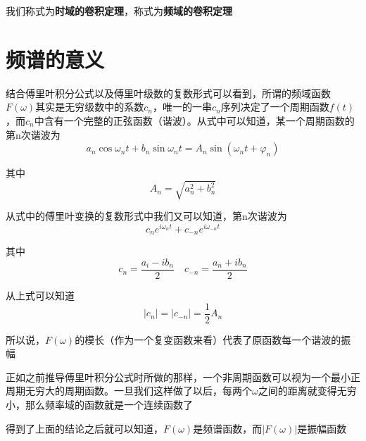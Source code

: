         我们称式为\textbf{时域的卷积定理}，称式为\textbf{频域的卷积定理}

    \section{频谱的意义}
        结合傅里叶积分公式以及傅里叶级数的复数形式可以看到，所谓的频域函数$F(\omega)$其实是无穷级数中的系数$c_n$，唯一的一串$c_n$序列决定了一个周期函数$f(t)$，而$c_n$中含有一个完整的正弦函数（谐波）。从式中可以知道，某一个周期函数的第n次谐波为
        \begin{equation}
            a_n\cos \omega_n t+b_n\sin\omega_n t=A_n\sin(\omega_n t + \varphi_n)
            \label{eq: 1.34}
        \end{equation}

        其中
        \begin{equation}
            A_n = \sqrt{a_n^2+b_n^2}
            \label{eq: 1.35}
        \end{equation}

        从式中的傅里叶变换的复数形式中我们又可以知道，第n次谐波为
        \begin{equation}
            c_ne^{i\omega_nt}+c_{-n}e^{i\omega_{-n}t}
            \label{eq: 1.36}
        \end{equation}

        其中
        \begin{equation}
            c_n=\dfrac{a_i-ib_n}{2}\quad c_{-n} = \dfrac{a_n + ib_n}{2}
            \label{eq: 1.37}
        \end{equation}

        从上式可以知道
        \begin{equation}
            |c_n| = |c_{-n}| = \dfrac 1 2 A_n
            \label{eq: 1.38}
        \end{equation}

        所以说，$F(\omega)$的模长（作为一个复变函数来看）代表了原函数每一个谐波的振幅
        
        正如之前推导傅里叶积分公式时所做的那样，一个非周期函数可以视为一个最小正周期无穷大的周期函数。一旦我们这样做了以后，每两个$\omega$之间的距离就变得无穷小，那么频率域的函数就是一个连续函数了
        
        得到了上面的结论之后就可以知道，$F(\omega)$是频谱函数，而$|F(\omega)|$是振幅函数

